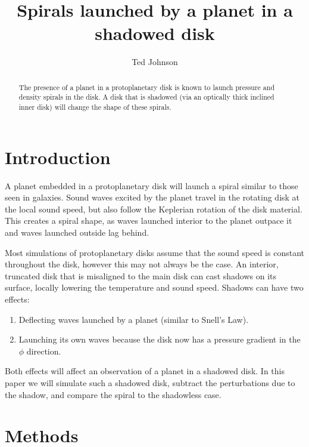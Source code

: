\documentclass[twocolumn]{aastex631}
\begin{document}
\title{Spirals launched by a planet in a shadowed disk}

\author{Ted Johnson}

\begin{abstract}
    The presence of a planet in a protoplanetary disk is known to launch pressure and
    density spirals in the disk. A disk that is shadowed (via an optically thick inclined inner disk)
    will change the shape of these spirals.
\end{abstract}

\section{Introduction}
\label{sec:intro}

A planet embedded in a protoplanetary disk will launch a spiral similar to those seen in galaxies.
Sound waves excited by the planet travel in the rotating disk at the local sound speed, but also follow
the Keplerian rotation of the disk material. This creates a spiral shape, as waves launched interior to
the planet outpace it and waves launched outside lag behind.

Most simulations of protoplanetary disks assume that the sound speed is constant throughout the disk,
however this may not always be the case. An interior, truncated disk that is misaligned to the main disk can
cast shadows on its surface, locally lowering the temperature and sound speed. Shadows can have two effects:
\begin{enumerate}
    \item Deflecting waves launched by a planet (similar to Snell's Law).
    \item Launching its own waves because the disk now has a pressure gradient in the $\phi$ direction.
\end{enumerate}

Both effects will affect an observation of a planet in a shadowed disk. In this paper we will simulate
such a shadowed disk, subtract the perturbations due to the shadow, and compare the spiral to the
shadowless case.

\section{Methods}
\label{sec:methods}
\end{document}
